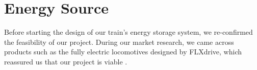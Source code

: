 \section{Energy Source}
    
    
    
    
Before starting the design of our train's energy storage system, we re-confirmed the feasibility of our project. During our market research, we came across products such as the fully electric locomotives designed by FLXdrive, which reassured us that our project is viable \cite{FLXdrive}.

